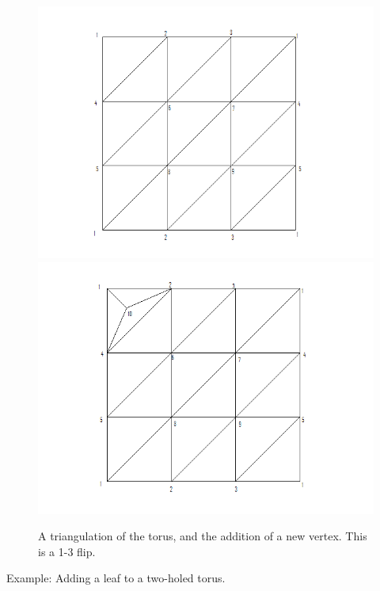 \documentclass[12pt]{article}
\begin{document}
\begin{figure}
\includegraphics[scale = 0.5]{torus2.png}
\includegraphics[scale = 0.5]{torus2addvertex.png}
\caption{A triangulation of the torus, and the addition of a new vertex. This is a 1-3 flip.}
\label{torusaddv}
\end{figure}

\noindent Example: Adding a leaf to a two-holed torus.\newline
\end{document}
